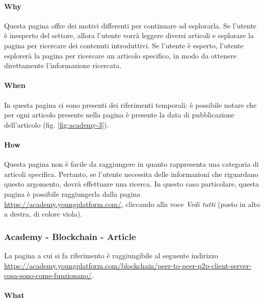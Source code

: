 \paragraph{Why}

Questa pagina offre dei motivi differenti per continuare ad esplorarla. 
Se l'utente è inesperto del settore, allora l'utente vorrà leggere 
diversi articoli e esplorare la pagina per ricercare dei contenuti 
introduttivi. Se l'utente è esperto, l'utente esplorerà la pagina per 
ricercare un articolo specifico, in modo da ottenere direttamente 
l'informazione ricercata.

\paragraph{When}

In questa pagina ci sono presenti dei riferimenti temporali: è possibile 
notare che per ogni articolo presente nella pagina è presente la data di 
pubblicazione dell'articolo (fig. \ref{fig:academy-3}).

\paragraph{How}

Questa pagina non è facile da raggiungere in quanto rappresenta una 
categoria di articoli specifica. Pertanto, se l'utente necessita delle 
informazioni che riguardano questo argomento, dovrà effettuare una ricerca. 
In questo caso particolare, questa pagina è possibile raggiungerla dalla 
pagina 
\href{https://academy.youngplatform.com/}{https://academy.youngplatform.com/}, 
cliccando alla voce \textit{Vedi tutti} (posto in alto a destra, di colore 
viola).

\subsubsection{Academy - Blockchain - Article}

La pagina a cui si fa riferimento è raggiungibile al seguente indirizzo \\
\href{https://academy.youngplatform.com/blockchain/peer-to-peer-p2p-client-server-cosa-sono-come-funzionano/}{https://academy.youngplatform.com/blockchain/peer-to-peer-p2p-client-server-cosa-sono-come-funzionano/}.

\paragraph{What}

